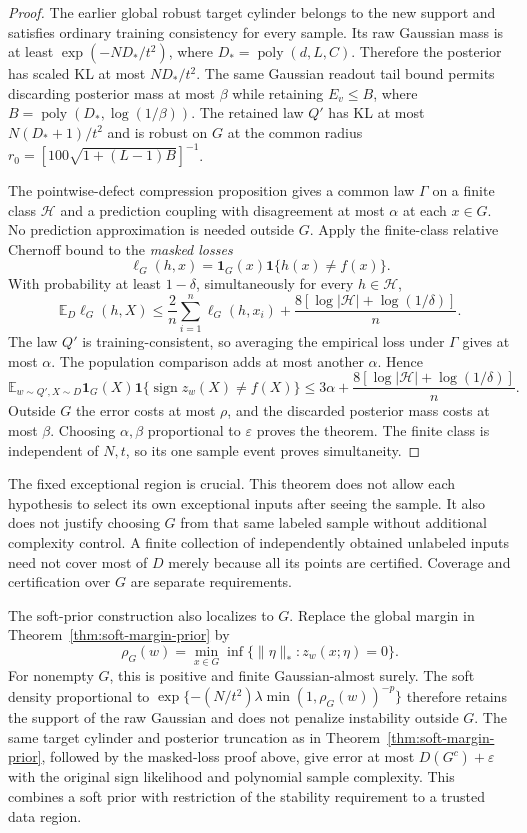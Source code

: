 \begin{proof}
The earlier global robust target cylinder belongs to the new support and
satisfies ordinary training consistency for every sample. Its raw Gaussian
mass is at least $\exp(-ND_*/t^2)$, where
$D_*=\operatorname{poly}(d,L,C)$. Therefore the posterior has scaled KL
at most $ND_*/t^2$. The same Gaussian readout tail bound permits discarding
posterior mass at most $\beta$ while retaining $E_v\le B$, where
$B=\operatorname{poly}(D_*,\log(1/\beta))$.
The retained law $Q'$ has KL at most $N(D_*+1)/t^2$ and is robust on $G$
at the common radius $r_0=[100\sqrt{1+(L-1)B}]^{-1}$.

The pointwise-defect compression proposition gives a common law $\Gamma$
on a finite class $\mathcal H$ and a prediction coupling with disagreement
at most $\alpha$ at each $x\in G$. No prediction approximation is needed
outside $G$. Apply the finite-class relative Chernoff bound to the
\emph{masked losses}
\[
 \ell_G(h,x)=\mathbf1_G(x)\mathbf1\{h(x)\ne f(x)\}.
\]
With probability at least $1-\delta$, simultaneously for every
$h\in\mathcal H$,
\[
 \mathbb E_D\ell_G(h,X)
 \le\frac2n\sum_{i=1}^n\ell_G(h,x_i)
       +\frac{8[\log|\mathcal H|+\log(1/\delta)]}{n}.
\]
The law $Q'$ is training-consistent, so averaging the empirical loss under
$\Gamma$ gives at most $\alpha$. The population comparison adds at most
another $\alpha$. Hence
\[
 \mathbb E_{w\sim Q',X\sim D}
    \mathbf1_G(X)\mathbf1\{\operatorname{sign}z_w(X)\ne f(X)\}
 \le3\alpha+
       \frac{8[\log|\mathcal H|+\log(1/\delta)]}{n}.
\]
Outside $G$ the error costs at most $\rho$, and the discarded posterior
mass costs at most $\beta$. Choosing $\alpha,\beta$ proportional to
$\varepsilon$ proves the theorem. The finite class is independent of
$N,t$, so its one sample event proves simultaneity.
\end{proof}

The fixed exceptional region is crucial. This theorem does not allow each
hypothesis to select its own exceptional inputs after seeing the sample.
It also does not justify choosing $G$ from that same labeled sample without
additional complexity control. A finite collection of independently
obtained unlabeled inputs need not cover most of $D$ merely because all its
points are certified. Coverage and certification over $G$ are separate
requirements.

The soft-prior construction also localizes to $G$. Replace the global
margin in Theorem~\ref{thm:soft-margin-prior} by
\[
 \rho_G(w)=\min_{x\in G}\inf\{\|\eta\|_*:z_w(x;\eta)=0\}.
\]
For nonempty $G$, this is positive and finite Gaussian-almost surely.
The soft density proportional to
$\exp\{-(N/t^2)\lambda\min(1,\rho_G(w))^{-p}\}$ therefore retains the
support of the raw Gaussian and does not penalize instability outside $G$.
The same target cylinder and posterior truncation as in
Theorem~\ref{thm:soft-margin-prior}, followed by the masked-loss proof above,
give error at most $D(G^c)+\varepsilon$ with the original sign likelihood
and polynomial sample complexity. This combines a soft prior with
restriction of the stability requirement to a trusted data region.

